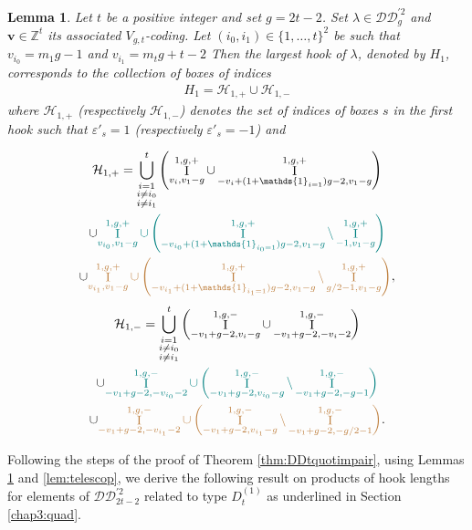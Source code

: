 \documentclass[11pt,letterpaper]{amsart}
\def\bbbz{\mathbb Z}
\def\cch{\mathcal H}
\def\ccdd{\mathcal {DD}}
\newtheorem{lm}[df]{Lemma}
\DeclareMathOperator{\I}{I}
\numberwithin{equation}{section}
\numberwithin{df}{section}
\begin{document}
\begin{lm}\label{lem:maxhookddprimed}
Let $t$ be a positive integer and set $g=2t-2$. Set $\lambda\in \ccdd_{g}^{'2}$ and $\mathbf{v}\in\bbbz^{t}$ its associated $V_{g,t}$-coding. Let $(i_0,i_1)\in\lbrace 1,\dots,t\rbrace^2$ be such that $v_{i_0}=m_1g-1$ and $v_{i_1}=m_tg+t-2$
Then the largest hook of $\lambda$, denoted by $H_1$, corresponds to the collection of boxes of indices 
\begin{align*}
H_1=\cch_{1,+}\cup\cch_{1,-}
\end{align*}
where $\cch_{1,+}$ (respectively $\cch_{1,-}$) denotes the set of indices of boxes $s$ in the first hook such that $\varepsilon'_s=1$ (respectively $\varepsilon'_s=-1$) and


\begin{multline*}
\cch_{1,+}=  \displaystyle\bigcup_{\substack{i=1\\ i\neq i_0\\ i\neq i_1}}^{t}\left(\I_{v_i,v_1	-g}^{1,g,+}\cup \I_{-v_i+(1+\mathds{1}_{i=1})g-2,v_1-g}^{1,g,+}\right)\\\cup \textcolor{teal}{\I_{v_{i_0},v_1-g}^{1,g,+}\cup \left(\I_{-v_{i_0}+ (1+\mathds{1}_{i_0=1})g-2,v_1-g}^{1,g,+}\setminus \I_{-1,v_1-g}^{1,g,+}\right)}\\
\cup\textcolor{brown}{\I_{v_{i_1},v_1-g}^{1,g,+}\cup \left(\I_{-v_{i_1}+(1+\mathds{1}_{i_1=1})g-2,v_1-g}^{1,g,+}\setminus \I_{g/2-1,v_1-g}^{1,g,+}\right)},
 \end{multline*}
 \begin{multline*}
\cch_{1,-}=\displaystyle\bigcup_{\substack{i=1\\ i\neq i_0\\ i\neq i_1}}^{t}\left(\I_{-v_1+g-2,v_i-g}^{1,g,-}\cup \I_{-v_1+g-2,-v_i-2}^{1,g,-}\right)\\\cup\textcolor{teal}{\I_{-v_1+g-2,-v_{i_0}-2}^{1,g,-}\cup\left(\I_{-v_1+g-2,v_{i_0}-g}^{1,g,-}\setminus \I_{-v_1+g-2,-g-1}^{1,g,-}\right)}\\\cup\textcolor{brown}{\I_{-v_1+g-2,-v_{i_1}-2}^{1,g,-}\cup\left(\I_{-v_1+g-2,v_{i_1}-g}^{1,g,-}\setminus \I_{-v_1+g-2,-g/2-1}^{1,g,-}\right)} .
\end{multline*}
\end{lm}



Following the steps of the proof of Theorem \ref{thm:DDtquotimpair}, using Lemmas \ref{lem:maxhookddprimed} and \ref{lem:telescop}, we derive the following result on products of hook lengths for elements of $\ccdd_{2t-2}^{'2}$ related to type $D^{(1)}_{t}$ as underlined in Section \ref{chap3:quad}.
\end{document}
